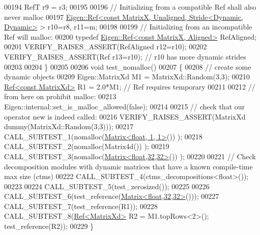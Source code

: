 \begin{DoxyCode}
00194   RefT r9 = r3;
00195 
00196   \textcolor{comment}{// Initializing from a compatible Ref shall also never malloc}
00197   \hyperlink{group___core___module_class_eigen_1_1_ref}{Eigen::Ref<const MatrixX, Unaligned, Stride<Dynamic, Dynamic>}
       > r10=r8, r11=m;
00198 
00199   \textcolor{comment}{// Initializing from an incompatible Ref will malloc:}
00200   \textcolor{keyword}{typedef} \hyperlink{group___core___module_class_eigen_1_1_ref}{Eigen::Ref<const MatrixX, Aligned>} RefAligned;
00201   VERIFY\_RAISES\_ASSERT(RefAligned r12=r10);
00202   VERIFY\_RAISES\_ASSERT(Ref r13=r10); \textcolor{comment}{// r10 has more dynamic strides}
00203 
00204 \}
00205 
00206 \textcolor{keywordtype}{void} test\_nomalloc()
00207 \{
00208   \textcolor{comment}{// create some dynamic objects}
00209   Eigen::MatrixXd M1 = MatrixXd::Random(3,3);
00210   \hyperlink{group___core___module_class_eigen_1_1_ref}{Ref<const MatrixXd>} R1 = 2.0*M1; \textcolor{comment}{// Ref requires temporary}
00211 
00212   \textcolor{comment}{// from here on prohibit malloc:}
00213   Eigen::internal::set\_is\_malloc\_allowed(\textcolor{keyword}{false});
00214 
00215   \textcolor{comment}{// check that our operator new is indeed called:}
00216   VERIFY\_RAISES\_ASSERT(MatrixXd dummy(MatrixXd::Random(3,3)));
00217   CALL\_SUBTEST\_1(nomalloc(\hyperlink{group___core___module_class_eigen_1_1_matrix}{Matrix<float, 1, 1>}()) );
00218   CALL\_SUBTEST\_2(nomalloc(Matrix4d()) );
00219   CALL\_SUBTEST\_3(nomalloc(\hyperlink{group___core___module_class_eigen_1_1_matrix}{Matrix<float,32,32>}()) );
00220   
00221   \textcolor{comment}{// Check decomposition modules with dynamic matrices that have a known compile-time max size (ctms)}
00222   CALL\_SUBTEST\_4(ctms\_decompositions<float>());
00223 
00224   CALL\_SUBTEST\_5(test\_zerosized());
00225 
00226   CALL\_SUBTEST\_6(test\_reference(\hyperlink{group___core___module_class_eigen_1_1_matrix}{Matrix<float,32,32>}()));
00227   CALL\_SUBTEST\_7(test\_reference(R1));
00228   CALL\_SUBTEST\_8(\hyperlink{group___core___module_class_eigen_1_1_ref}{Ref<MatrixXd>} R2 = M1.topRows<2>(); test\_reference(R2));
00229 \}
\end{DoxyCode}
